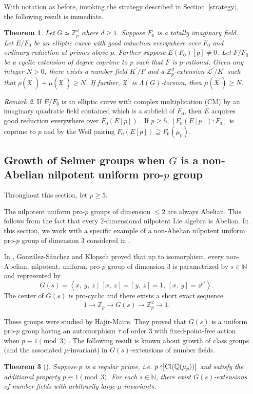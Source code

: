 \documentclass{amsart}
\DeclareMathOperator{\Cl}{Cl}
\newcommand{\QQ}{\mathbb Q}
\newcommand{\ZZ}{\mathbb Z}
\newcommand{\NN}{\mathbb N}
\newcommand{\Linf}{\mathcal{L}}
\newcommand{\X}{\mathfrak X}
\newtheorem{Th}{Theorem}[section]
\theoremstyle{definition}
\theoremstyle{remark}
\newtheorem{rem}[Th]{Remark}
\begin{document}
With notation as before, invoking the strategy described in Section~\ref{strategy}, the following result is immediate.

\begin{Th}
\label{selmer analogue of HM}
Let $G\simeq \ZZ_p^d$ where $d\geq 1$.
Suppose $F_0$ is a totally imaginary field.
Let $E/F_0$ be an elliptic curve with good reduction everywhere over $F_0$ and ordinary reduction at primes above $p$.
Further suppose $E(F_0)[p]\neq 0$.
Let $F/F_0$ be a cyclic extension of degree coprime to $p$ such that $F$ is $p$-rational.
Given any integer $N>0$, there exists a number field $K^\prime/F$ and a $\ZZ_p^d$-extension $\Linf^\prime/K^\prime$ such that $\rho(\X^\prime) + \mu(\X^\prime) \geq N$.
If further, $\X^\prime$ is $\Lambda(G)$-torsion, then $\mu(\X^\prime) \geq N$.  
\end{Th}

\begin{rem} 
If $E/F_0$ is an elliptic curve with complex multiplication (CM) by an imaginary quadratic field contained which is a subfield of $F_0$, then $E$ acquires good reduction everywhere over $F_0(E[p])$ \cite{ST68}.
If $p\geq 5$, $[F_0(E[p]):F_0]$ is coprime to $p$ and by the Weil pairing $F_0(E[p]) \supseteq F_0(\mu_p)$.
\end{rem}

\subsection{Growth of Selmer groups when $G$ is a non-Abelian nilpotent uniform pro-$p$ group}
Throughout this section, let $p \geq 5$.

The nilpotent uniform pro-$p$ groups of dimension $\leq 2$ are always Abelian.
This follows from the fact that every 2-dimensional nilpotent Lie algebra is Abelian.
In this section, we work with a specific example of a non-Abelian nilpotent uniform pro-$p$ group of dimension 3 considered in \cite{HM19}.

In \cite[Theorem 7.4]{GSK09}, Gonz{\'a}lez-S{\'a}nchez and Klopsch proved that up to isomorphism, every non-Abelian, nilpotent, uniform, pro-$p$ group of dimension 3 is parametrized by $s\in \NN$ and represented by
\[
G(s) = \left\langle x, \ y, \ z \mid [x, \ z] = [y, \ z] =1, \ [x, \ y]=z^{p^s}\right\rangle .
\]
The center of $G(s)$ is pro-cyclic and there exists a short exact sequence
\[
1 \rightarrow \ZZ_p \rightarrow G(s) \rightarrow \ZZ_p^2 \rightarrow 1.
\]

These groups were studied by Hajir-Maire.
They proved that $G(s)$ is a uniform pro-$p$ group having an automorphism $\tau$ of order 3 with fixed-point-free action when $p\equiv 1 \pmod{3}$ \cite[Proposition 5.1]{HM19}.
The following result is known about growth of class groups (and the associated $\mu$-invariant) in $G(s)$-extensions of number fields.
\begin{Th}[{\cite[Corollary 5.3]{HM19}}]
\label{HM particular}
Suppose $p$ is a regular prime, i.e. $p\nmid \abs{\Cl(\QQ(\mu_p))}$ and satisfy the additional property $p\equiv 1 \pmod{3}$.
For each $s\in \NN$, there exist $G(s)$-extensions of number fields with arbitrarily large $\mu$-invariants.
\end{Th}
\end{document}
